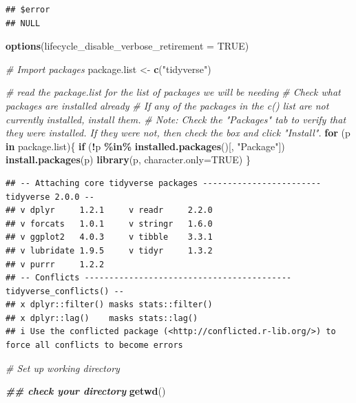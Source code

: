 \documentclass[
]{article}
\newenvironment{Shaded}{\begin{snugshade}}{\end{snugshade}}
\newcommand{\AttributeTok}[1]{\textcolor[rgb]{0.13,0.29,0.53}{#1}}
\newcommand{\CommentTok}[1]{\textcolor[rgb]{0.56,0.35,0.01}{\textit{#1}}}
\newcommand{\ConstantTok}[1]{\textcolor[rgb]{0.56,0.35,0.01}{#1}}
\newcommand{\ControlFlowTok}[1]{\textcolor[rgb]{0.13,0.29,0.53}{\textbf{#1}}}
\newcommand{\DocumentationTok}[1]{\textcolor[rgb]{0.56,0.35,0.01}{\textbf{\textit{#1}}}}
\newcommand{\FunctionTok}[1]{\textcolor[rgb]{0.13,0.29,0.53}{\textbf{#1}}}
\newcommand{\NormalTok}[1]{#1}
\newcommand{\OtherTok}[1]{\textcolor[rgb]{0.56,0.35,0.01}{#1}}
\newcommand{\SpecialCharTok}[1]{\textcolor[rgb]{0.81,0.36,0.00}{\textbf{#1}}}
\newcommand{\StringTok}[1]{\textcolor[rgb]{0.31,0.60,0.02}{#1}}
\begin{document}
\begin{verbatim}
## $error
## NULL
\end{verbatim}

\begin{Shaded}
\begin{Highlighting}[]
\FunctionTok{options}\NormalTok{(}\AttributeTok{lifecycle\_disable\_verbose\_retirement =} \ConstantTok{TRUE}\NormalTok{)}
\end{Highlighting}
\end{Shaded}

\begin{Shaded}
\begin{Highlighting}[]
\CommentTok{\# Import packages}
\NormalTok{package.list }\OtherTok{\textless{}{-}} \FunctionTok{c}\NormalTok{(}\StringTok{"tidyverse"}\NormalTok{)}

\CommentTok{\# read the \textasciigrave{}package.list\textasciigrave{} for the list of packages we will be needing}
\CommentTok{\# Check what packages are installed already}
\CommentTok{\# If any of the packages in the c() list are not currently installed, install them.}
\CommentTok{\# Note: Check the "Packages" tab to verify that they were installed. If they were not, then check the box and click "Install".}
\ControlFlowTok{for}\NormalTok{ (p }\ControlFlowTok{in}\NormalTok{ package.list)\{}
  \ControlFlowTok{if}\NormalTok{ (}\SpecialCharTok{!}\NormalTok{p }\SpecialCharTok{\%in\%} \FunctionTok{installed.packages}\NormalTok{()[, }\StringTok{"Package"}\NormalTok{]) }\FunctionTok{install.packages}\NormalTok{(p)}
  \FunctionTok{library}\NormalTok{(p, }\AttributeTok{character.only=}\ConstantTok{TRUE}\NormalTok{)}
\NormalTok{\}}
\end{Highlighting}
\end{Shaded}

\begin{verbatim}
## -- Attaching core tidyverse packages ------------------------ tidyverse 2.0.0 --
## v dplyr     1.2.1     v readr     2.2.0
## v forcats   1.0.1     v stringr   1.6.0
## v ggplot2   4.0.3     v tibble    3.3.1
## v lubridate 1.9.5     v tidyr     1.3.2
## v purrr     1.2.2     
## -- Conflicts ------------------------------------------ tidyverse_conflicts() --
## x dplyr::filter() masks stats::filter()
## x dplyr::lag()    masks stats::lag()
## i Use the conflicted package (<http://conflicted.r-lib.org/>) to force all conflicts to become errors
\end{verbatim}

\begin{Shaded}
\begin{Highlighting}[]
\CommentTok{\# Set up working directory}

\DocumentationTok{\#\# check your directory}
\FunctionTok{getwd}\NormalTok{()}
\end{Highlighting}
\end{Shaded}
\end{document}
